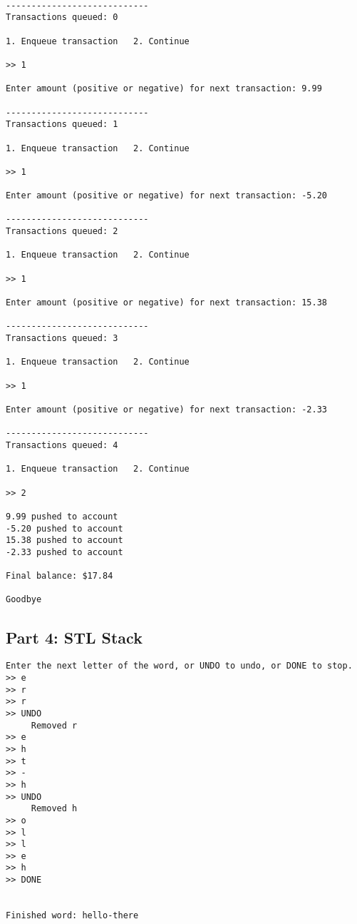 \begin{lstlisting}[style=output]

----------------------------
Transactions queued: 0

1. Enqueue transaction	 2. Continue

>> 1

Enter amount (positive or negative) for next transaction: 9.99

----------------------------
Transactions queued: 1

1. Enqueue transaction	 2. Continue

>> 1

Enter amount (positive or negative) for next transaction: -5.20

----------------------------
Transactions queued: 2

1. Enqueue transaction	 2. Continue

>> 1

Enter amount (positive or negative) for next transaction: 15.38 

----------------------------
Transactions queued: 3

1. Enqueue transaction	 2. Continue

>> 1

Enter amount (positive or negative) for next transaction: -2.33

----------------------------
Transactions queued: 4

1. Enqueue transaction	 2. Continue

>> 2

9.99 pushed to account
-5.20 pushed to account
15.38 pushed to account
-2.33 pushed to account

Final balance: $17.84

Goodbye
\end{lstlisting}

    \newpage
    \subsection{Part 4: STL Stack}

\begin{lstlisting}[style=output]
Enter the next letter of the word, or UNDO to undo, or DONE to stop.
>> e
>> r
>> r
>> UNDO
	 Removed r
>> e
>> h
>> t
>> -
>> h
>> UNDO
	 Removed h
>> o
>> l
>> l
>> e
>> h
>> DONE


Finished word: hello-there
\end{lstlisting}

    \newpage
